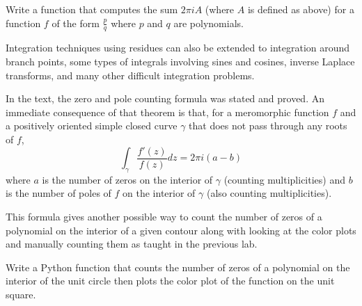 \begin{problem}
Write a function that computes the sum $2\pi i A$ (where $A$ is defined as above) for a function $f$ of the form $\frac{p}{q}$ where $p$ and $q$ are polynomials.
\end{problem}

Integration techniques using residues can also be extended to integration around branch points, some types of integrals involving sines and cosines, inverse Laplace transforms, and many other difficult integration problems.

\begin{problem}
In the text, the zero and pole counting formula was stated and proved.
An immediate consequence of that theorem is that, for a meromorphic function $f$ and a positively oriented simple closed curve $\gamma$ that does not pass through any roots of $f$,
\[\int_\gamma \frac{f'\left(z\right)}{f\left(z\right)} dz = 2 \pi i \left(a - b\right)\]
where $a$ is the number of zeros on the interior of $\gamma$ (counting multiplicities) and $b$ is the number of poles of $f$ on the interior of $\gamma$ (also counting multiplicities).

This formula gives another possible way to count the number of zeros of a polynomial on the interior of a given contour along with looking at the color plots and manually counting them as taught in the previous lab.

Write a Python function that counts the number of zeros of a polynomial on the interior of the unit circle then plots the color plot of the function on the unit square.
\end{problem}